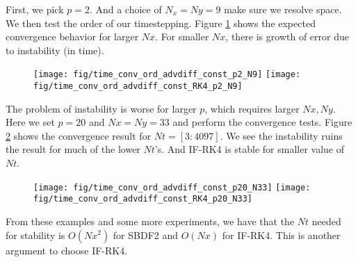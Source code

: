 \documentclass[11pt,letterpaper]{article}
\begin{document}
First, we pick $p = 2$. And a choice of $N_x = Ny = 9$ make sure we resolve space. We then test the order of our timestepping. Figure \ref{fig:time_conv_ord_advdiff_const_p2_N9} shows the expected convergence behavior for larger $Nx$. For smaller $Nx$, there is growth of error due to instability (in time).
\begin{figure}[H]
    \centering
    \texttt{[image: fig/time\_conv\_ord\_advdiff\_const\_p2\_N9]}
    \texttt{[image: fig/time\_conv\_ord\_advdiff\_const\_RK4\_p2\_N9]}
    \caption{}\label{fig:time_conv_ord_advdiff_const_p2_N9}
\end{figure}
The problem of instability is worse for larger $p$, which requires larger $Nx,Ny$. Here we set $p=20$ and $Nx = Ny = 33$ and perform the convergence tests. Figure \ref{fig:time_conv_ord_advdiff_const_p20_N33} shows the convergence result for $Nt = [3:4097]$. We see the instability ruins the result for much of the lower $Nt$'s. And IF-RK4 is stable for smaller value of $Nt$.
\begin{figure}[H]
    \centering
    \texttt{[image: fig/time\_conv\_ord\_advdiff\_const\_p20\_N33]}
    \texttt{[image: fig/time\_conv\_ord\_advdiff\_const\_RK4\_p20\_N33]}
    \caption{}\label{fig:time_conv_ord_advdiff_const_p20_N33}
\end{figure}
From these examples and some more experiments, we have that the $Nt$ needed for stability is $O(Nx^2)$ for SBDF2 and $O(Nx)$ for IF-RK4. This is another argument to choose IF-RK4. 

\newpage


\end{document}
